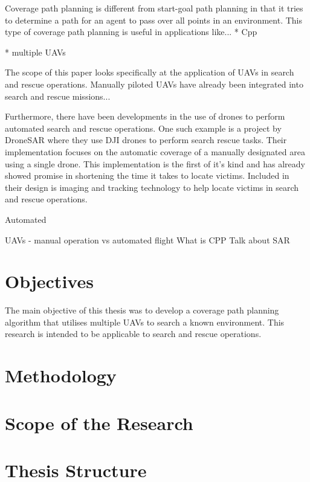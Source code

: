 Coverage path planning is different from start-goal path planning in that it tries to determine a path for an agent to pass over all points in an environment\cite{Choset2001}. This type of coverage path planning is useful in applications like...
* Cpp

* multiple UAVs

The scope of this paper looks specifically at the application of UAVs in search and rescue operations. Manually piloted UAVs have already been integrated into search and rescue missions... 

Furthermore, there have been developments in the use of drones to perform automated search and rescue operations. One such example is a project by DroneSAR where they use DJI drones to perform search rescue tasks. Their implementation focuses on the automatic coverage of a manually designated area using a single drone. This implementation is the first of it's kind and has already showed promise in shortening the time it takes to locate victims. Included in their design is imaging and tracking technology to help locate victims in search and rescue operations.




Automated 

UAVs - manual operation vs automated flight
What is CPP
Talk about SAR


\section{Objectives}

The main objective of this thesis was to develop a coverage path planning algorithm that utilises multiple UAVs to search a known environment. This research is intended to be applicable to search and rescue operations.\linebreak
\cite{CPP-Survey-2019}


\section{Methodology}

\section{Scope of the Research}

\section{Thesis Structure}
